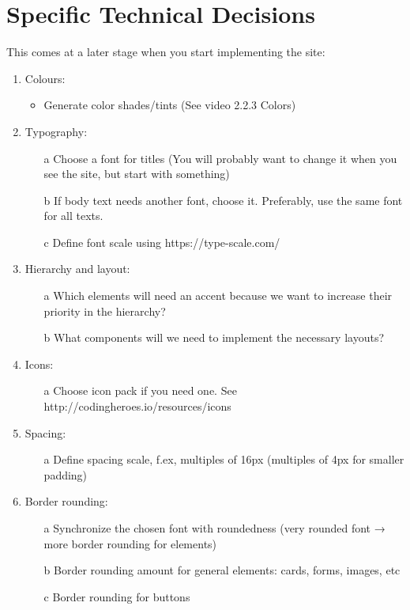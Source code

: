 \documentclass{article}
\begin{document}
\section{Specific Technical Decisions }
This comes at a later stage when you start implementing the site:
\begin{enumerate}
    \item Colours:
    \begin{itemize}
        \item Generate color shades/tints (See video 2.2.3 Colors)
    \end{itemize}
    \item Typography:
    \begin{enumerate}
        \item[a] Choose a font for titles (You will probably want to change it when you see the site, but
start with something)
        \item[b] If body text needs another font, choose it. Preferably, use the same font for all texts.
        \item[c] Define font scale using https://type-scale.com/
    \end{enumerate}
    \item Hierarchy and layout:
    \begin{enumerate}
        \item[a] Which elements will need an accent because we want to increase their priority in the
hierarchy?
        \item[b] What components will we need to implement the necessary layouts?
    \end{enumerate}
    \item Icons:
    \begin{enumerate}
        \item[a] Choose icon pack if you need one. See http://codingheroes.io/resources/icons
    \end{enumerate}
    \item  Spacing:
        \begin{enumerate}
        \item[a] Define spacing scale, f.ex, multiples of 16px (multiples of 4px for smaller padding)
    \end{enumerate}
    \item  Border rounding:
        \begin{enumerate}
        \item[a] Synchronize the chosen font with roundedness (very rounded font → more border
rounding for elements)
        \item[b]  Border rounding amount for general elements: cards, forms, images, etc
        \item[c] Border rounding for buttons
    \end{enumerate}
\end{enumerate}
\end{document}
